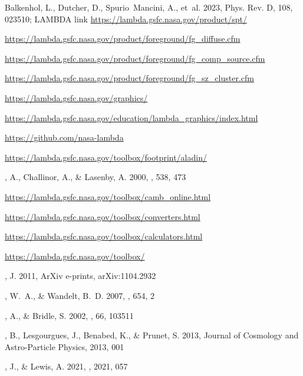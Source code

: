 \documentclass[twocolumn,tighten]{aastex631}
\begin{document}
\begin{thebibliography}
\quad Balkenhol, L., Dutcher, D., Spurio~Mancini, A., {et~al.} 2023, Phys. Rev. D,
  108, 023510; LAMBDA link \url{https://lambda.gsfc.nasa.gov/product/spt/}

\quad \url{https://lambda.gsfc.nasa.gov/product/foreground/fg_diffuse.cfm}

\quad \url{https://lambda.gsfc.nasa.gov/product/foreground/fg_comp_source.cfm}

\quad \url{https://lambda.gsfc.nasa.gov/product/foreground/fg_sz_cluster.cfm}

\quad \url{https://lambda.gsfc.nasa.gov/graphics/}

\quad \url{https://lambda.gsfc.nasa.gov/education/lambda_graphics/index.html}

\quad \url{https://github.com/nasa-lambda}

\quad \url{https://lambda.gsfc.nasa.gov/toolbox/footprint/aladin/}

, A., {Challinor}, A., \& {Lasenby}, A. 2000, \apj, 538, 473

\quad \url{https://lambda.gsfc.nasa.gov/toolbox/camb_online.html}

\quad \url{https://lambda.gsfc.nasa.gov/toolbox/converters.html}

\quad \url{https://lambda.gsfc.nasa.gov/toolbox/calculators.html}

\quad \url{https://lambda.gsfc.nasa.gov/toolbox/}

, J. 2011, ArXiv e-prints, arXiv:1104.2932


, W.~A., \& {Wandelt}, B.~D. 2007, \apj, 654, 2

, A., \& {Bridle}, S. 2002, \prd, 66, 103511

, B., {Lesgourgues}, J., {Benabed}, K., \& {Prunet}, S. 2013, Journal
  of Cosmology and Astro-Particle Physics, 2013, 001
  
, J., \& {Lewis}, A. 2021, \jcap, 2021, 057


\end{thebibliography}
\end{document}
